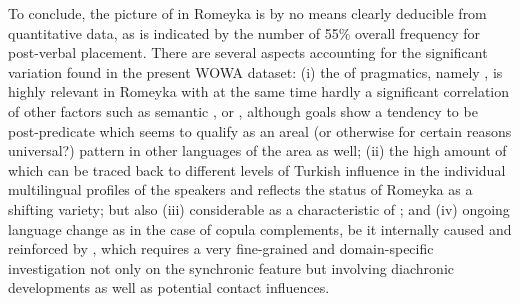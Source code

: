 \documentclass[output=paper,colorlinks,citecolor=brown]{langscibook}
\begin{document}
To conclude, the picture of  in Romeyka is by no means clearly deducible from quantitative data, as is indicated by the number of 55\% overall frequency for post-verbal placement. There are several aspects accounting for the significant variation found in the present WOWA dataset: (i) the  of pragmatics, namely , is highly relevant in Romeyka with at the same time hardly a significant correlation of other factors such as semantic ,  or , although goals show a tendency to be post-predicate which seems to qualify as an areal (or otherwise for certain reasons universal?) pattern in other languages of the area as well; (ii) the high amount of  which can be traced back to different levels of Turkish influence in the individual multilingual profiles of the speakers and reflects the status of Romeyka as a shifting variety; but also (iii) considerable  as a characteristic of ; and (iv) ongoing language change as in the case of copula complements, be it internally caused and reinforced by , which requires a very fine-grained and domain-specific investigation not only on the synchronic feature but involving diachronic developments as well as potential contact influences.



\end{document}
